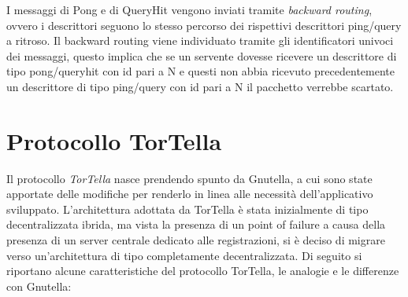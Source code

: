 I messaggi di Pong e di QueryHit vengono inviati tramite \textit{backward routing}, ovvero i descrittori seguono lo stesso percorso dei rispettivi descrittori ping/query a ritroso. Il backward routing viene individuato tramite gli identificatori univoci dei messaggi, questo implica che se un servente dovesse ricevere un descrittore di tipo pong/queryhit con id pari a N e questi non abbia ricevuto precedentemente un descrittore di tipo ping/query con id pari a N il pacchetto verrebbe scartato.
\section{Protocollo TorTella}
Il protocollo \textit{TorTella} nasce prendendo spunto da Gnutella, a cui sono state apportate delle modifiche per renderlo in linea alle necessità dell’applicativo sviluppato. L’architettura adottata da TorTella è stata inizialmente di tipo decentralizzata ibrida, ma vista la presenza di un point of failure a causa della presenza di un server centrale dedicato alle registrazioni, si è deciso di migrare verso un’architettura di tipo completamente decentralizzata. 
Di seguito si riportano alcune caratteristiche del protocollo TorTella, le analogie e le differenze con Gnutella:
